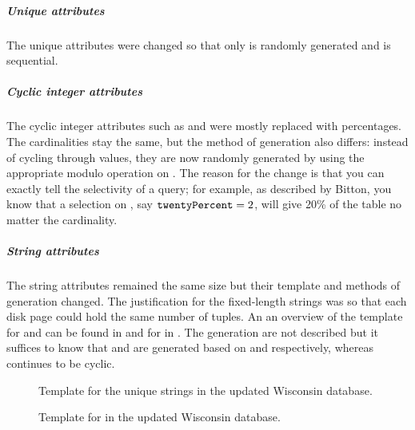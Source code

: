 \subparagraph{Unique attributes} The unique attributes were changed so that only
 is randomly generated and
 is sequential.

\subparagraph{Cyclic integer attributes} The cyclic integer attributes such as
 and  were mostly replaced
with percentages. The cardinalities stay the same, but the method of generation
also differs: instead of cycling through values, they are now randomly generated
by using the appropriate modulo operation on . The
reason for the change is that you can exactly tell the selectivity of a query;
for example, as described by Bitton, you know that a selection on
, say $\mathtt{twentyPercent} = 2$,
will give 20\% of the table no matter the cardinality.

\subparagraph{String attributes} The string attributes remained the same size
but their template and methods of generation changed. The justification for the
fixed-length strings was so that each disk page could hold the same number of
tuples. An an overview of the template for  and
 can be found in 
and for  in . The
generation are not described but it suffices to know that
 and  are generated
based on  and 
respectively, whereas  continues to be cyclic.

\begin{figure}[h]
    \centering
    \NewWisconsinUString

    \caption{Template for the unique strings in the updated Wisconsin database.}
    \label{fig:NewWisconsinUniqueString}
\end{figure}

\begin{figure}[h]
    \centering
    \NewWisconsinCyclicStringDef{}

    \caption{Template for  in the updated Wisconsin database.}
    \label{fig:NewWisconsinCyclicString}
\end{figure}


